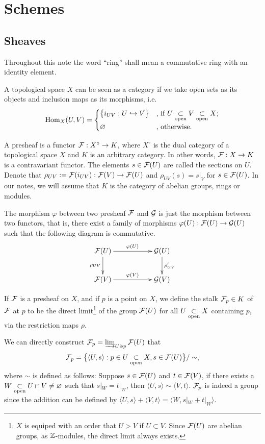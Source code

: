 \documentclass[12pt]{extbook}
\begin{document}
\setcounter{chapter}{1}
\chapter{Schemes}
\section{Sheaves}
Throughout this note the word ``ring'' shall mean a commutative ring with an identity element.

\para A topological space $X$ can be seen as a category if we take open sets as its objects and inclusion maps as its morphisms, i.e. 
\[
	\operatorname{Hom}_{X}(U,V)=\begin{cases}
	\bigl\{i_{UV}:U\hookrightarrow V\bigr\}&\text{, if }U\underset{\mathrm{open}}{\subset} V\underset{\mathrm{open}}{\subset} X\text{;}\\
	\varnothing&\text{, otherwise}.
	\end{cases}
\]

\para A presheaf is a functor $\mathcal{F}:X^\circ\to K$, where $X^\circ$ is the dual category of a topological space $X$ and $K$ is an arbitrary category. In other words, $\mathcal{F}:X\to K$ is a contravariant functor. The elements $s\in \mathcal{F}(U)$ are called the sections on $U$. Denote that $\rho_{UV}:=\mathcal{F}(i_{UV}):\mathcal{F}(V)\to\mathcal{F}(U)$ and $\rho_{UV}(s)=s|_V$ for $s \in \mathcal{F}(U)$. In our notes, we will assume that $K$ is the category of abelian groups, rings or modules.

The morphism $\varphi$ between two presheaf $\mathcal{F}$ and $\mathcal{G}$ is just the morphism between two functors, that is, there exist a family of morphisms $\varphi(U):\mathcal{F}(U)\to \mathcal{G}(U)$ such that the following diagram is commutative.
\[
	\xymatrix{
		\calf(U)\ar[rr]^{\varphi(U)} \ar[d]_{\rho_{UV}}&&\calg(U) \ar[d]^{\rho'_{UV}}\\
		\calf(V)\ar[rr]^{\varphi(V)}&&\calg(V)
	}
\]

\para If $\mathcal{F}$ is a presheaf on $X$, and if $p$ is a point on $X$, we define the stalk $\mathcal{F}_p\in K$ of $\mathcal{F}$ at $p$ to be the direct limit\footnote{$X$ is equiped with an order that $U>V$ if $U\subset V$. Since $\mathcal{F}(U)$ are abelian groups, as $\mathbb{Z}$-modules, the direct limit always exists.} of the group $\mathcal{F}(U)$ for all $U \underset{\mathrm{open}}{\subset} X$ containing $p$, via the restriction maps $\rho$.

We can directly construct $\mathcal{F}_p=\varinjlim_{U\ni p}\mathcal{F}(U)$ that 
\[
	\mathcal{F}_p=\bigl\{\langle U,s\rangle: p\in U\underset{\mathrm{open}}{\subset} X, s\in \mathcal{F}(U)\bigr\}/\sim,
\]
where $\sim$ is defined as follows: Suppose $s\in\mathcal{F}(U)$ and $t\in\mathcal{F}(V)$, if there exists a $W\underset{\mathrm{open}}{\subset} U\cap V\neq \varnothing$ such that $s|_W=t|_W$, then $\langle U,s\rangle\sim\langle V,t\rangle$. $\mathcal{F}_p$ is indeed a group since the addition can be defined by $\langle U,s\rangle+\langle V,t\rangle=\langle W,s|_W+t|_W\rangle$. 
\end{document}
